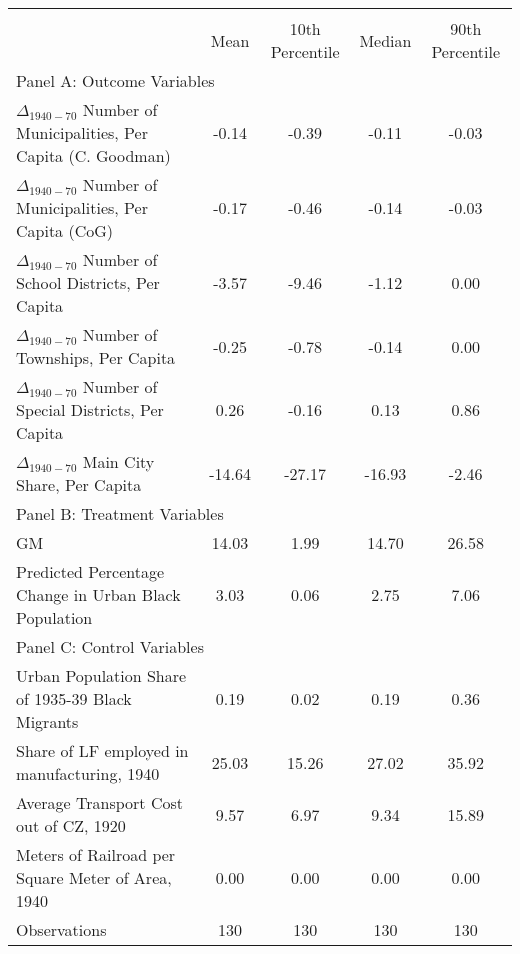  \begin{tabular}{l*{4}{c}} \toprule
                &\multicolumn{4}{c}{}                   \\
                &     Mean&10th Percentile&   Median&90th Percentile\\
\cmidrule(lr){1-5}
\multicolumn{5}{l}{Panel A: Outcome Variables}\\
\cmidrule(lr){1-5}
$\Delta_{1940-70}$ Number of Municipalities, Per Capita (C. Goodman)&    -0.14&    -0.39&    -0.11&    -0.03\\
$\Delta_{1940-70}$ Number of Municipalities, Per Capita (CoG)&    -0.17&    -0.46&    -0.14&    -0.03\\
$\Delta_{1940-70}$ Number of School Districts, Per Capita&    -3.57&    -9.46&    -1.12&     0.00\\
$\Delta_{1940-70}$ Number of Townships, Per Capita&    -0.25&    -0.78&    -0.14&     0.00\\
$\Delta_{1940-70}$ Number of Special Districts, Per Capita&     0.26&    -0.16&     0.13&     0.86\\
$\Delta_{1940-70}$ Main City Share, Per Capita&   -14.64&   -27.17&   -16.93&    -2.46\\
\cmidrule(lr){1-5}
\multicolumn{5}{l}{Panel B: Treatment Variables}\\
\cmidrule(lr){1-5}
GM              &    14.03&     1.99&    14.70&    26.58\\
Predicted Percentage Change in Urban Black Population&     3.03&     0.06&     2.75&     7.06\\
\cmidrule(lr){1-5}
\multicolumn{5}{l}{Panel C: Control Variables}\\
\cmidrule(lr){1-5}
Urban Population Share of 1935-39 Black Migrants&     0.19&     0.02&     0.19&     0.36\\
Share of LF employed in manufacturing, 1940&    25.03&    15.26&    27.02&    35.92\\
Average Transport Cost out of CZ, 1920&     9.57&     6.97&     9.34&    15.89\\
Meters of Railroad per Square Meter of Area, 1940&     0.00&     0.00&     0.00&     0.00\\
\midrule Observations    &      130   &      130   &      130   &      130   \\    \bottomrule \end{tabular}

